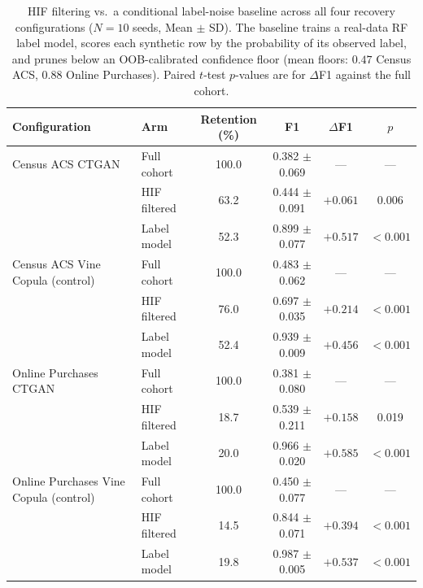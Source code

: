 \documentclass[pdflatex,sn-mathphys-num]{sn-jnl}
\theoremstyle{thmstyleone}%
\theoremstyle{thmstyletwo}%
\theoremstyle{thmstylethree}%
\begin{document}
\begin{table}[htbp]
\centering
\caption{HIF filtering vs.\ a conditional label-noise baseline across all four recovery configurations ($N=10$ seeds, Mean $\pm$ SD). The baseline trains a real-data RF label model, scores each synthetic row by the probability of its observed label, and prunes below an OOB-calibrated confidence floor (mean floors: $0.47$ Census ACS, $0.88$ Online Purchases). Paired $t$-test $p$-values are for $\Delta$F1 against the full cohort.}
\label{tab:label_noise}
\footnotesize
\setlength{\tabcolsep}{4pt}
\begin{tabular}{@{}llcccc@{}}
\toprule
Configuration & Arm & Retention (\%) & F1 & $\Delta$F1 & $p$ \\
\midrule
Census ACS CTGAN & Full cohort & 100.0 & 0.382 $\pm$ 0.069 & --- & --- \\
 & HIF filtered & 63.2 & 0.444 $\pm$ 0.091 & $+0.061$ & 0.006 \\
 & Label model & 52.3 & 0.899 $\pm$ 0.077 & $+0.517$ & $<0.001$ \\
\addlinespace
Census ACS Vine Copula (control) & Full cohort & 100.0 & 0.483 $\pm$ 0.062 & --- & --- \\
 & HIF filtered & 76.0 & 0.697 $\pm$ 0.035 & $+0.214$ & $<0.001$ \\
 & Label model & 52.4 & 0.939 $\pm$ 0.009 & $+0.456$ & $<0.001$ \\
\addlinespace
Online Purchases CTGAN & Full cohort & 100.0 & 0.381 $\pm$ 0.080 & --- & --- \\
 & HIF filtered & 18.7 & 0.539 $\pm$ 0.211 & $+0.158$ & 0.019 \\
 & Label model & 20.0 & 0.966 $\pm$ 0.020 & $+0.585$ & $<0.001$ \\
\addlinespace
Online Purchases Vine Copula (control) & Full cohort & 100.0 & 0.450 $\pm$ 0.077 & --- & --- \\
 & HIF filtered & 14.5 & 0.844 $\pm$ 0.071 & $+0.394$ & $<0.001$ \\
 & Label model & 19.8 & 0.987 $\pm$ 0.005 & $+0.537$ & $<0.001$ \\
\bottomrule
\end{tabular}
\end{table}
\end{document}
